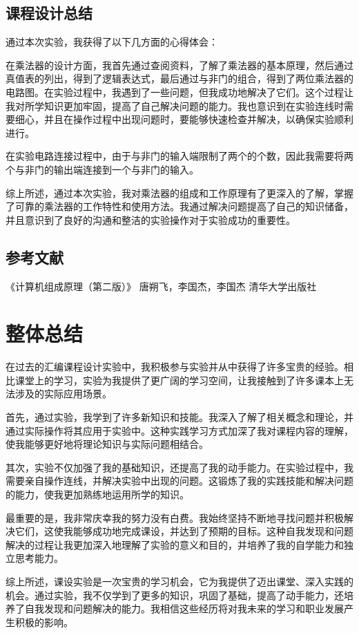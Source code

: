\documentclass[UTF8,12pt]{article}
\begin{document}
\subsection{课程设计总结}
通过本次实验，我获得了以下几方面的心得体会：

在乘法器的设计方面，我首先通过查阅资料，了解了乘法器的基本原理，然后通过真值表的列出，得到了逻辑表达式，最后通过与非门的组合，得到了两位乘法器的电路图。在实验过程中，我遇到了一些问题，但我成功地解决了它们。这个过程让我对所学知识更加牢固，提高了自己解决问题的能力。我也意识到在实验连线时需要细心，并且在操作过程中出现问题时，要能够快速检查并解决，以确保实验顺利进行。

在实验电路连接过程中，由于与非门的输入端限制了两个的个数，因此我需要将两个与非门的输出端连接到一个与非门的输入。

综上所述，通过本次实验，我对乘法器的组成和工作原理有了更深入的了解，掌握了可靠的乘法器的工作特性和使用方法。我通过解决问题提高了自己的知识储备，并且意识到了良好的沟通和整洁的实验操作对于实验成功的重要性。

\subsection{参考文献}
《计算机组成原理（第二版）》  唐朔飞，李国杰，李国杰   清华大学出版社

\section{整体总结}
在过去的汇编课程设计实验中，我积极参与实验并从中获得了许多宝贵的经验。相比课堂上的学习，实验为我提供了更广阔的学习空间，让我接触到了许多课本上无法涉及的实际应用场景。

首先，通过实验，我学到了许多新知识和技能。我深入了解了相关概念和理论，并通过实际操作将其应用于实验中。这种实践学习方式加深了我对课程内容的理解，使我能够更好地将理论知识与实际问题相结合。

其次，实验不仅加强了我的基础知识，还提高了我的动手能力。在实验过程中，我需要亲自操作连线，并解决实验中出现的问题。这锻炼了我的实践技能和解决问题的能力，使我更加熟练地运用所学的知识。

最重要的是，我非常庆幸我的努力没有白费。我始终坚持不断地寻找问题并积极解决它们，这使我能够成功地完成课设，并达到了预期的目标。这种自我发现和问题解决的过程让我更加深入地理解了实验的意义和目的，并培养了我的自学能力和独立思考能力。

综上所述，课设实验是一次宝贵的学习机会，它为我提供了迈出课堂、深入实践的机会。通过实验，我不仅学到了更多的知识，巩固了基础，提高了动手能力，还培养了自我发现和问题解决的能力。我相信这些经历将对我未来的学习和职业发展产生积极的影响。
\end{document}
